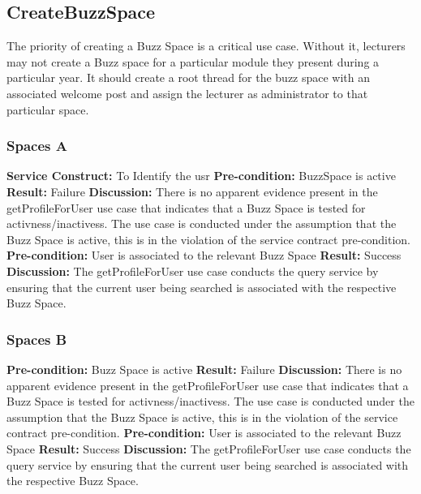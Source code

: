 
\subsection{CreateBuzzSpace}
The priority of creating a Buzz Space is a critical use case. Without it, lecturers may not create a Buzz space for a particular module they present during a particular year. It should create a root thread for the buzz space with an associated welcome post and assign the lecturer as administrator to that particular space.

\subsubsection{Spaces A}
\textbf{Service Construct:}  To Identify the usr \newline
\textbf{Pre-condition:}  BuzzSpace is active \newline
\textbf{Result:}  Failure \newline
\textbf{Discussion:}  There is no apparent evidence present in the getProfileForUser use case that indicates that a Buzz Space is tested for activness/inactivess.
The use case is conducted under the assumption that the Buzz Space is active, this is in the violation of the service contract pre-condition. \newline \newline
\textbf{Pre-condition:}  User is associated to the relevant Buzz Space\newline
\textbf{Result:}  Success \newline
\textbf{Discussion:}  The getProfileForUser use case conducts the query service by ensuring that the current user being searched is associated with the respective Buzz Space.
\subsubsection{Spaces B}
\textbf{Pre-condition:}  Buzz Space is active \newline
\textbf{Result:}  Failure \newline
\textbf{Discussion:}  There is no apparent evidence present in the getProfileForUser use case that indicates that a Buzz Space is tested for activness/inactivess.
The use case is conducted under the assumption that the Buzz Space is active, this is in the violation of the service contract pre-condition. \newline \newline
\textbf{Pre-condition:}  User is associated to the relevant Buzz Space\newline
\textbf{Result:}  Success \newline
\textbf{Discussion:}  The getProfileForUser use case conducts the query service by ensuring that the current user being searched is associated with the respective Buzz Space.

